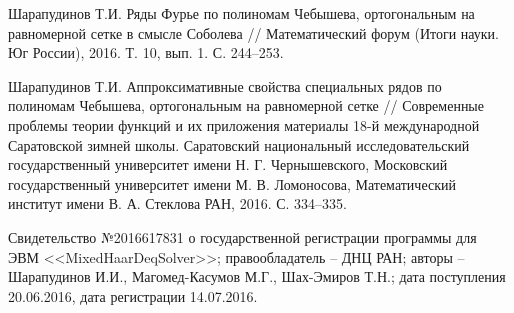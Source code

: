 \begin{thebibliography}{1}
Шарапудинов Т.И. Ряды Фурье по полиномам Чебышева, ортогональным на равномерной сетке в смысле Соболева // Математический форум (Итоги науки. Юг России), 2016. Т. 10, вып. 1. С. 244--253.

 Шарапудинов Т.И. Аппроксимативные свойства специальных рядов по полиномам Чебышева, ортогональным на равномерной сетке // Современные проблемы теории функций и их приложения материалы 18-й международной Саратовской зимней школы. Саратовский национальный исследовательский государственный университет имени Н. Г. Чернышевского, Московский государственный университет имени М. В. Ломоносова, Математический институт имени В. А. Стеклова РАН, 2016. С. 334--335.

 Свидетельство №2016617831 о государственной регистрации программы для ЭВМ <<MixedHaarDeqSolver>>; правообладатель – ДНЦ РАН; авторы – Шарапудинов И.И., Магомед-Касумов М.Г., Шах-Эмиров Т.Н.; дата поступления 20.06.2016, дата регистрации 14.07.2016.


\end{thebibliography} 